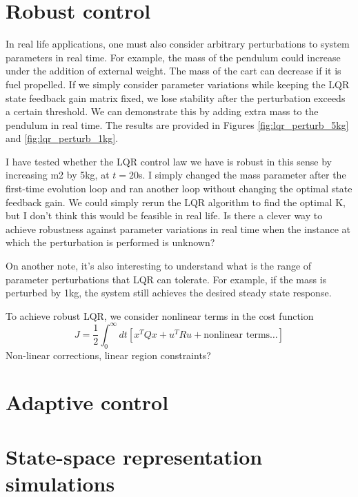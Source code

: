 \documentclass[12pt]{article}
\numberwithin{equation}{section}
\begin{document}
\section{Robust control}
In real life applications, one must also consider arbitrary perturbations to system parameters in real time. For example, the mass of the pendulum could increase under the addition of external weight. The mass of the cart can decrease if it is fuel propelled. If we simply consider parameter variations while keeping the LQR state feedback gain matrix fixed, we lose stability after the perturbation exceeds a certain threshold. We can demonstrate this by adding extra mass to the pendulum in real time. The results are provided in Figures \ref{fig:lqr_perturb_5kg} and \ref{fig:lqr_perturb_1kg}.

I have tested whether the LQR control law we have is robust in this sense by increasing m2 by 5kg, at $t = 20$s. I simply changed the mass parameter after the first-time evolution loop and ran another loop without changing the optimal state feedback gain. We could simply rerun the LQR algorithm to find the optimal K, but I don't think this would be feasible in real life. Is there a clever way to achieve robustness against parameter variations in real time when the instance at which the perturbation is performed is unknown?

On another note, it's also interesting to understand what is the range of parameter perturbations that LQR can tolerate. For example, if the mass is perturbed by 1kg, the system still achieves the desired steady state response.

To achieve robust LQR, we consider nonlinear terms in the cost function
\begin{equation}
    J = \frac{1}{2} \int_{0}^{\infty}dt \left[x^T Q x + u^T R u + \text{nonlinear terms} \dots \right]
\end{equation}
Non-linear corrections, linear region constraints?

\section{Adaptive control}


\newpage
\appendix

\section{State-space representation simulations}
\label{app:zero-input-sim}
\end{document}
